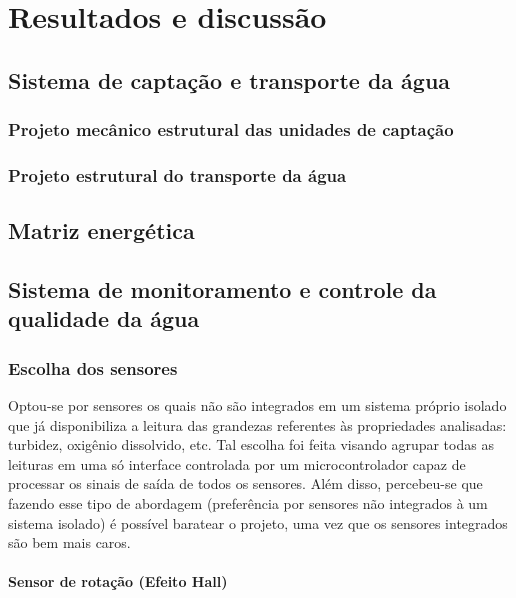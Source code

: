 \chapter[Resultados]{Resultados e discussão}
 
  \section{Sistema de captação e transporte da água}
  
    \subsection{Projeto mecânico estrutural das unidades de captação}
   
    
    \subsection{Projeto estrutural do transporte da água}
    
  \section{Matriz energética}
  
    
  \section{Sistema de monitoramento e controle da qualidade da água}
    
    \subsection{Escolha dos sensores}
      
      Optou-se por sensores os quais não são integrados em um sistema próprio isolado que já disponibiliza a leitura das grandezas
      referentes às propriedades analisadas: turbidez, oxigênio dissolvido, etc. Tal escolha foi feita visando agrupar todas as
      leituras em uma só interface controlada por um microcontrolador capaz de processar os sinais de saída de todos os sensores.
      Além disso, percebeu-se que fazendo esse tipo de abordagem (preferência por sensores não integrados à um sistema isolado)
      é possível baratear o projeto, uma vez que os sensores integrados são bem mais caros.
      
      \subsubsection{Sensor de rotação (Efeito Hall)}
	
